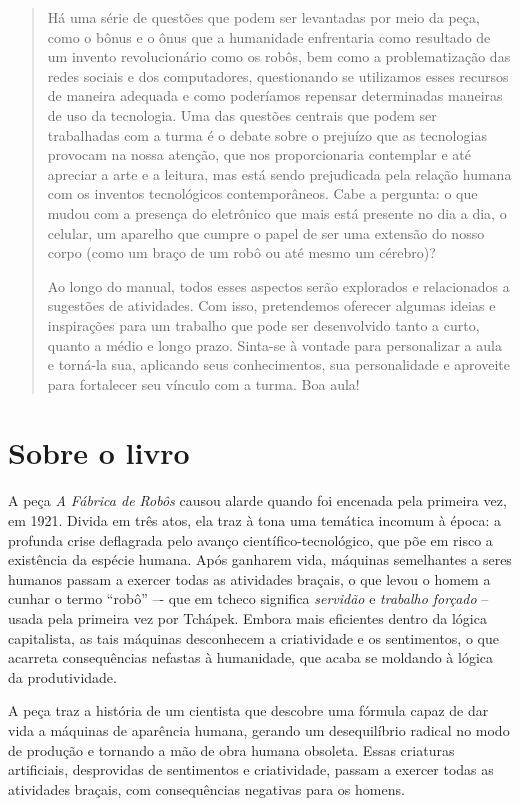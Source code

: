 \documentclass[11pt]{extarticle}
\begin{document}
\begin{abstract}
Há uma série de questões que podem ser levantadas por meio da peça, como o bônus e o ônus que a humanidade enfrentaria como resultado de um invento revolucionário como os robôs, bem como a problematização das redes sociais e dos computadores, questionando se utilizamos esses recursos de maneira adequada e como poderíamos repensar determinadas maneiras de uso da tecnologia. Uma das questões centrais que podem ser trabalhadas com a turma é o debate sobre o prejuízo que as tecnologias provocam na nossa atenção, que nos proporcionaria contemplar e até apreciar a arte e a leitura, mas está sendo prejudicada pela relação humana com os inventos tecnológicos contemporâneos. Cabe a pergunta: o que mudou com a presença do eletrônico que mais está presente no dia a dia, o celular, um aparelho que cumpre o papel de ser uma extensão do nosso corpo (como um braço de um robô ou até mesmo um cérebro)? 

Ao longo do manual, todos esses aspectos serão explorados e relacionados a sugestões de atividades. Com isso, pretendemos oferecer algumas ideias e inspirações para um trabalho que pode ser desenvolvido tanto a curto, quanto a médio e longo prazo. Sinta-se à vontade para personalizar a aula e torná-la sua, aplicando seus conhecimentos, sua 
personalidade e aproveite para fortalecer seu vínculo com a turma.
Boa aula!

\end{abstract}

\section{Sobre o livro}

A peça \textit{A Fábrica de Robôs} causou alarde quando foi encenada pela primeira vez, em 1921. Divida em três atos, ela traz à tona uma temática incomum à época: a profunda crise deflagrada pelo avanço científico-tecnológico, que põe em risco a existência da espécie humana. Após ganharem vida, máquinas semelhantes a seres humanos passam a exercer todas as atividades braçais, o que levou o homem a cunhar o termo “robô” –- que em tcheco significa \textit{servidão} e \textit{trabalho forçado} -- usada pela primeira vez por Tchápek. Embora mais eficientes dentro da lógica capitalista, as tais máquinas desconhecem a criatividade e os sentimentos, o que acarreta consequências nefastas à humanidade, que acaba se moldando à lógica da produtividade. 

A peça traz a história de um cientista que descobre uma fórmula capaz de dar vida a máquinas de aparência humana, gerando um desequilíbrio radical no modo de produção e tornando a mão de obra humana obsoleta. Essas criaturas artificiais, desprovidas de sentimentos e criatividade, passam a exercer todas as atividades braçais, com consequências negativas para os homens.
\end{document}
